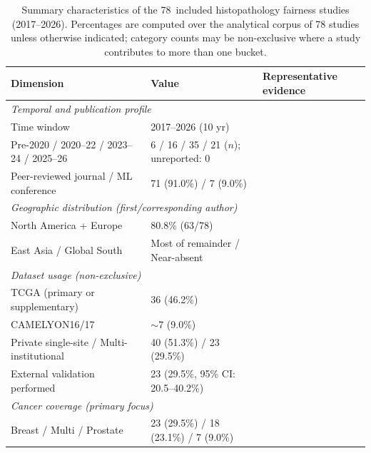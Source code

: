 \begin{table}[htbp]
  \centering
  \renewcommand{\arraystretch}{0.82}
  \caption{Summary characteristics of the 78~included
           histopathology fairness studies (2017--2026). Percentages
           are computed over the analytical corpus of 78 studies unless
           otherwise indicated; category counts may be non-exclusive
           where a study contributes to more than one bucket.}
  \label{tab:study_characteristics}
  \footnotesize
  \begin{tabularx}{\linewidth}{@{}l l X@{}}
    \toprule
    \textbf{Dimension} & \textbf{Value} & \textbf{Representative evidence} \\
    \midrule
    \multicolumn{3}{l}{\textit{Temporal and publication profile}} \\
    Time window & 2017--2026 (10 yr) & \citep{howard2021site, huang2025knowledge} \\
    Pre-2020 / 2020--22 / 2023--24 / 2025--26 & 6 / 16 / 35 / 21 ($n$); unreported: 0 & \citep{komen2024batch, vaidya2024demographic} \\
    Peer-reviewed journal / ML conference & 71 (91.0\%) / 7 (9.0\%) & \citep{cheng2021challenges, chen2025predicting} \\
    \midrule
    \multicolumn{3}{l}{\textit{Geographic distribution (first/corresponding author)}} \\
    North America + Europe & 80.8\% (63/78) & \citep{howard2021site, komen2024batch, celi2022sources} \\
    East Asia / Global South & Most of remainder / Near-absent & \citep{musa2026cross, montezuma2025unbiased} \\
    \midrule
    \multicolumn{3}{l}{\textit{Dataset usage (non-exclusive)}} \\
    TCGA (primary or supplementary) & 36 (46.2\%) & \citep{howard2021site, dehkharghanian2023biased} \\
    CAMELYON16/17 & $\sim$7 (9.0\%) & \citep{komen2024batch, campanella2019clinical} \\
    Private single-site / Multi-institutional & 40 (51.3\%) / 23 (29.5\%) & \citep{soltan2024challenges, vaidya2024demographic} \\
    External validation performed & 23 (29.5\%, 95\% CI: 20.5--40.2\%) & \citep{lin2025contrastive, huang2025knowledge} \\
    \midrule
    \multicolumn{3}{l}{\textit{Cancer coverage (primary focus)}} \\
    Breast / Multi / Prostate & 23 (29.5\%) / 18 (23.1\%) / 7 (9.0\%) & \citep{vaidya2024demographic, howard2021site, dehkharghanian2023biased} \\

\end{tabularx}
\end{table}
